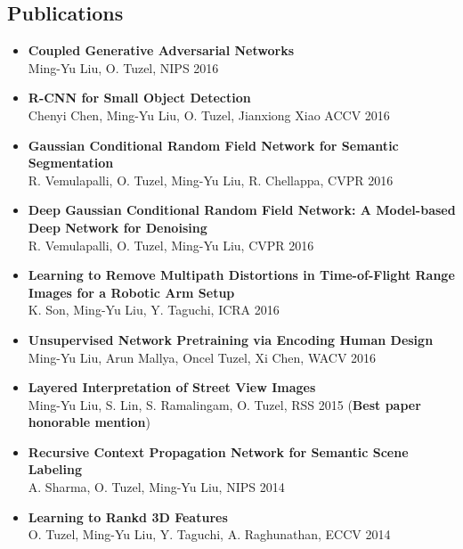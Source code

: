 \documentclass[10pt,letterpaper]{article}
\begin{document}
\subsection*{Publications}
\begin{itemize}
\item {\bf Coupled Generative Adversarial Networks}\\
      Ming-Yu Liu, O. Tuzel, NIPS 2016\vspace{-2mm}
\item {\bf R-CNN for Small Object Detection}\\
      Chenyi Chen, Ming-Yu Liu, O. Tuzel, Jianxiong Xiao ACCV 2016\vspace{-2mm}      
\item {\bf Gaussian Conditional Random Field Network for Semantic Segmentation}\\
      R. Vemulapalli, O. Tuzel, Ming-Yu Liu, R. Chellappa, CVPR 2016\vspace{-2mm}
\item {\bf Deep Gaussian Conditional Random Field Network: A Model-based Deep Network for Denoising}\\
      R. Vemulapalli, O. Tuzel, Ming-Yu Liu, CVPR 2016\vspace{-2mm}
\item {\bf Learning to Remove Multipath Distortions in Time-of-Flight Range Images for a Robotic Arm Setup}\\
      K. Son, Ming-Yu Liu, Y. Taguchi, ICRA 2016\vspace{-2mm}
\item {\bf Unsupervised Network Pretraining via Encoding Human Design}\\
      Ming-Yu Liu, Arun Mallya, Oncel Tuzel, Xi Chen, WACV 2016\vspace{-2mm}
\item {\bf Layered Interpretation of Street View Images}\\
      Ming-Yu Liu, S. Lin, S. Ramalingam, O. Tuzel, RSS 2015 ({\bf Best paper honorable mention})\vspace{-2mm}
\item {\bf Recursive Context Propagation Network for Semantic Scene Labeling}\\
			A. Sharma, O. Tuzel, {Ming-Yu Liu}, {NIPS} 2014\vspace{-2mm}
\item {\bf Learning to Rankd 3D Features}\\
			O. Tuzel, {Ming-Yu Liu}, Y. Taguchi, A. Raghunathan, {ECCV} 2014\vspace{-2mm}

\end{itemize}
\end{document}
